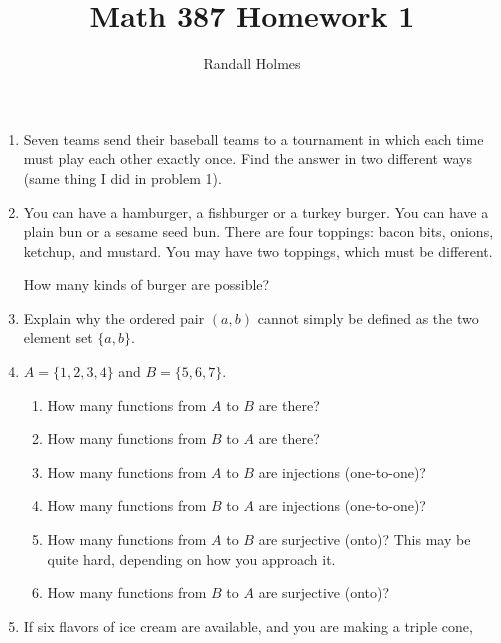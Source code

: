 \documentclass[12pt]{article}
\title{Math 387 Homework 1}
\author{Randall Holmes}
\begin{document}
\maketitle

\begin{enumerate}

\item  Seven teams send their baseball teams to a tournament in which each time must play each other exactly once.
Find the answer in two different ways (same thing I did in problem 1).

\newpage

\item  You can have a hamburger, a fishburger or a turkey burger.  You can have a plain bun or a sesame seed bun.
There are four toppings:  bacon bits, onions, ketchup, and mustard.  You may have two toppings, which must be different.

How many kinds of burger are possible?

\newpage

\item  Explain why the ordered pair $(a,b)$ cannot simply be defined as the two element set $\{a,b\}$.

\newpage

\item  $A = \{1,2,3,4\}$ and $B = \{5,6,7\}$.

\begin{enumerate}

\item  How many functions from $A$ to $B$ are there?

\item How many functions from $B$ to $A$ are there?

\item How many functions from $A$ to $B$ are injections (one-to-one)?

\item How many functions from $B$ to $A$ are injections (one-to-one)?

\item How many functions from $A$ to $B$ are surjective (onto)?  This may be quite hard, depending on how you approach it.

\item How many functions from $B$ to $A$ are surjective (onto)?

\end{enumerate}

\newpage

\item   If six flavors of ice cream are available, and you are making a triple cone, 



\end{enumerate}
\end{document}
